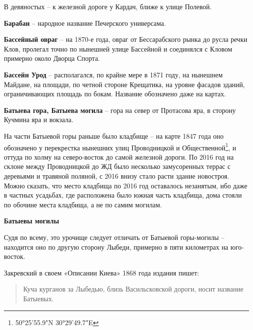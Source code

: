 В девяностых – к железной дороге у Кардач, ближе к улице Полевой.\\



\medskip


\textbf{Барабан} – народное название Печерского универсама.\\


\medskip


\textbf{Бассейный овраг} – на 1870-е года, овраг от Бессарабского рынка до русла речки Клов, пролегал точно по нынешней улице Бассейной и соединялся с Кловом примерно около Дворца Спорта.\\


\medskip


\textbf{Бассейн Урод} – располагался, по крайне мере в 1871 году, на нынешнем Майдане, на площади, по четной стороне Крещатика, на уровне фасадов зданий, ограничивающих площадь по бокам. Название обозначено даже на картах.\\


\medskip


\textbf{Батыева гора, Батыева могила} –  гора на север от Протасова яра, в сторону Кучмина яра и вокзала.

На части Батыевой горы раньше было кладбище – на карте 1847 года оно обозначено у перекрестка нынешних улиц Проводницкой и Общественной\footnote{50°25'55.9"N 30°29'49.7"E}, и оттуда по холму на северо-восток до самой железной дороги. По 2016 год на склоне между Проводницкой до ЖД было несколько замусоренных террас с деревьями и травяной поляной, с 2016 внизу стало расти здание новостроя. Можно сказать, что место кладбища по 2016 год оставалось незанятым, ибо даже в частных усадьбах, где расположена было южная часть кладбища, дома стояли по обочине места кладбища, а не по самим могилам.\\

\medskip


\textbf{Батыевы могилы}

Судя по всему, это урочище следует отличать от Батыевой горы-могилы – находится оно по другую сторону Лыбеди, примерно в пяти километрах на юго-восток.

Закревский в своем «Описании Киева» 1868 года издания пишет:

\begin{quotation}
\noindent Куча курганов за Лыбедью, близь Васильсковской дороги, носит название Батыевых.
\end{quotation}

